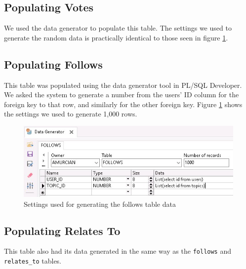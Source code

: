 
\subsection{Populating Votes}

We used the data generator to populate this table. The settings we used to generate the random data is practically identical to those seen in figure \ref{follows-generator}.

\subsection{Populating Follows}

This table was populated using the data generator tool in PL/SQL Developer. We asked the system to generate a number from the users' ID column for the foreign key to that row, and similarly for the other foreign key. Figure \ref{follows-generator} shows the settings we used to generate 1,000 rows.

\begin{figure}[htbp]
	\centering
	\includegraphics[width=\linewidth]{images/follows_generator.jpeg}
	\caption{Settings used for generating the follows table data}
	\label{follows-generator}
\end{figure}

\subsection{Populating Relates To}

This table also had its data generated in the same way as the \verb`follows` and \verb`relates_to` tables.